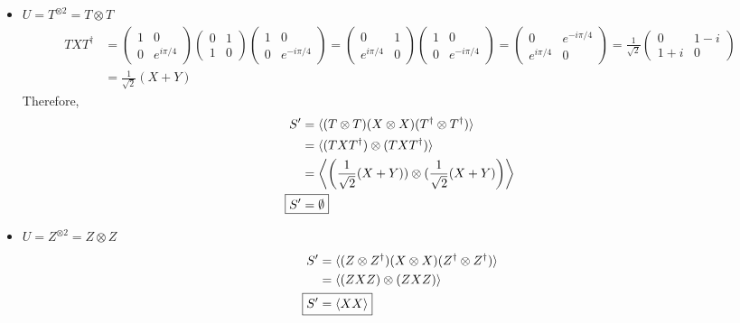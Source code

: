 \begin{itemize}
    \item $U = T^{\otimes 2} = T\otimes T$ 
    \begin{align}
        TXT^\dagger &= \begin{pmatrix} 1 & 0 \\ 0 & e^{i\pi/4} \end{pmatrix} \begin{pmatrix} 0 & 1 \\ 1 & 0 \end{pmatrix} \begin{pmatrix} 1 & 0 \\ 0 & e^{-i\pi/4} \end{pmatrix} = \begin{pmatrix} 0 & 1 \\ e^{i\pi/4} & 0 \end{pmatrix}\begin{pmatrix} 1 & 0 \\ 0 & e^{-i\pi/4} \end{pmatrix} = \begin{pmatrix} 0 & e^{-i\pi/4} \\ e^{i\pi/4} & 0 \end{pmatrix} = \frac{1}{\sqrt{2}} \begin{pmatrix} 0 & 1-i \\ 1+i & 0 \end{pmatrix} \\
        &= \frac{1}{\sqrt{2}}(X + Y)
    \end{align}
    Therefore, 
    \begin{align}
        S' &= \langle(T \otimes T)(X \otimes X)(T^\dagger \otimes T^\dagger)\rangle \\
        &= \langle (TXT^\dagger)\otimes (TXT^\dagger)\rangle \\
        &= \left\langle \left(\frac{1}{\sqrt{2}}(X + Y))\otimes (\frac{1}{\sqrt{2}}(X + Y)\right)\right\rangle \\
        \Aboxed{S' &= \emptyset}
    \end{align}
    \item $U = Z^{\otimes 2} = Z\otimes Z$ 
    \begin{align}
        S' &= \langle(Z \otimes Z^\dagger)(X \otimes X)(Z^\dagger \otimes Z^\dagger)\rangle \\
        &= \langle (ZXZ)\otimes (ZXZ)\rangle \\
        \Aboxed{S' &= \langle XX\rangle}
    \end{align}
  

\end{itemize}
